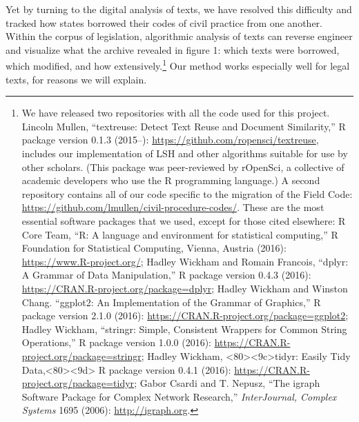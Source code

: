 \documentclass[12pt,]{article}
\let\rmarkdownfootnote\footnote%
\def\footnote{\protect\rmarkdownfootnote}
\begin{document}
Yet by turning to the digital analysis of texts, we have resolved this
difficulty and tracked how states borrowed their codes of civil practice
from one another. Within the corpus of legislation, algorithmic analysis
of texts can reverse engineer and visualize what the archive revealed in
figure 1: which texts were borrowed, which modified, and how
extensively.\footnote{We have released two repositories with all the
  code used for this project. Lincoln Mullen, ``textreuse: Detect Text
  Reuse and Document Similarity,'' R package version 0.1.3 (2015--):
  \url{https://github.com/ropensci/textreuse}, includes our
  implementation of LSH and other algorithms suitable for use by other
  scholars. (This package was peer-reviewed by rOpenSci, a collective of
  academic developers who use the R programming language.) A second
  repository contains all of our code specific to the migration of the
  Field Code: \url{https://github.com/lmullen/civil-procedure-codes/}.
  These are the most essential software packages that we used, except
  for those cited elsewhere: R Core Team, ``R: A language and
  environment for statistical computing,'' R Foundation for Statistical
  Computing, Vienna, Austria (2016): \url{https://www.R-project.org/};
  Hadley Wickham and Romain Francois, ``dplyr: A Grammar of Data
  Manipulation,'' R package version 0.4.3 (2016):
  \url{https://CRAN.R-project.org/package=dplyr}; Hadley Wickham and
  Winston Chang. ``ggplot2: An Implementation of the Grammar of
  Graphics,'' R package version 2.1.0 (2016):
  \url{https://CRAN.R-project.org/package=ggplot2}; Hadley Wickham,
  ``stringr: Simple, Consistent Wrappers for Common String Operations,''
  R package version 1.0.0 (2016):
  \url{https://CRAN.R-project.org/package=stringr}; Hadley Wickham,
  \textless80\textgreater\textless9c\textgreater tidyr: Easily Tidy
  Data,\textless80\textgreater\textless9d\textgreater{} R package
  version 0.4.1 (2016): \url{https://CRAN.R-project.org/package=tidyr};
  Gabor Csardi and T. Nepusz, ``The igraph Software Package for Complex
  Network Research,'' \emph{InterJournal, Complex Systems} 1695 (2006):
  \url{http://igraph.org}.} Our method works especially well for legal
texts, for reasons we will explain.
\end{document}
